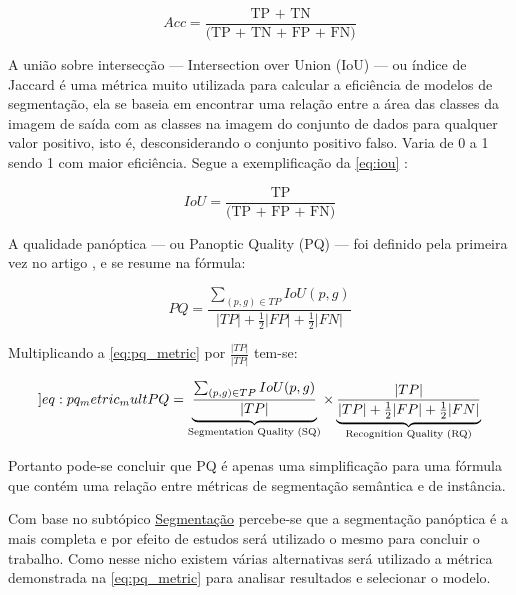 \begin{equation}
	\label{eq:acc}
	Acc = \frac{\text{TP + TN}}{\text{(TP + TN + FP + FN)}}
\end{equation}


A união sobre intersecção — Intersection over Union (IoU) — ou índice de Jaccard é uma métrica muito utilizada para calcular a eficiência de modelos de segmentação, ela se baseia em encontrar uma relação entre a área das classes da imagem de saída com as classes na imagem do conjunto de dados para qualquer valor positivo, isto é, desconsiderando o conjunto positivo falso. Varia de 0 a 1 sendo 1 com maior eficiência. Segue a exemplificação da \cref{eq:iou} \space\cite{iou_metric_link}:

\begin{equation}
	\label{eq:iou}
	IoU = \frac{\text{TP}}{\text{(TP + FP + FN)}}
\end{equation}


A qualidade panóptica — ou Panoptic Quality (PQ) — foi definido pela primeira vez no artigo , e se resume na fórmula:

\begin{equation}
\label{eq:pq_metric}
PQ = \frac{\sum_{(p,g)\in TP}IoU(p,g)}{ |TP| + \frac{1}{2}|FP| + \frac{1}{2}|FN|}
\end{equation}

Multiplicando a \cref{eq:pq_metric} por $\frac{|TP|}{|TP|}$ tem-se:

\begin{equation}
	\label[]{eq:pq_metric_mult}
	PQ = \underbrace{\frac{\sum_{(p,g)\in TP}IoU(p,g)}{|TP|}}_{\text{Segmentation Quality (SQ)}}
	\times
	\underbrace{\frac{|TP|}{|TP| + \frac{1}{2}|FP| + \frac{1}{2}|FN|}}_{\text{Recognition Quality (RQ)}}
\end{equation}

Portanto pode-se concluir que PQ é apenas uma simplificação para uma fórmula que contém uma relação entre métricas de segmentação semântica e de instância.

Com base no subtópico \hyperref[sec:segmentacao]{Segmentação} percebe-se que a segmentação panóptica é a mais completa e por efeito de estudos será utilizado o mesmo para concluir o trabalho. Como nesse nicho existem várias alternativas será utilizado a métrica demonstrada na \cref{eq:pq_metric} para analisar resultados e selecionar o modelo.


